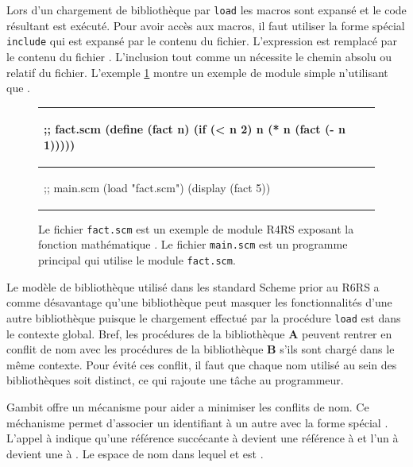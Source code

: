 Lors d'un chargement de bibliothèque par \texttt{load} les macros sont expansé
et le code résultant est exécuté. Pour avoir accès aux macros, il faut utiliser la
forme spécial \texttt{include} qui est expansé par le contenu du fichier.
L'expression  est remplacé par le contenu du fichier
. L'inclusion tout comme un  nécessite le chemin
absolu ou relatif du fichier. L'exemple \ref{fig:r4rs_fact} montre un exemple
de module simple n'utilisant que .

\begin{figure}[ht]
  \begin{center}
    \begin{tabular}{|l|}
    \hline
    \begin{mplisting}{0.4}
;; fact.scm
(define (fact n)
  (if (< n 2)
    n
    (* n (fact (- n 1)))))
\end{mplisting} \\\hline
    \begin{mplisting}{0.4}
;; main.scm
(load "fact.scm")
(display (fact 5))
\end{mplisting} \\\hline
    \end{tabular}
  \end{center}
  \caption{Le fichier \texttt{fact.scm} est un exemple de module R4RS exposant
  la fonction mathématique . Le fichier \texttt{main.scm} est un
  programme principal qui utilise le module \texttt{fact.scm}.}
  \label{fig:r4rs_fact}
\end{figure}

Le modèle de bibliothèque utilisé dans les standard Scheme prior au
R6RS\cite{Scheme:R6RS} a comme désavantage qu'une bibliothèque peut masquer les
fonctionnalités d'une autre bibliothèque puisque le chargement effectué par la
procédure \texttt{load} est dans le contexte global. Bref, les procédures de la
bibliothèque \textbf{A} peuvent rentrer en conflit de nom avec les procédures
de la bibliothèque \textbf{B} s'ils sont chargé dans le même contexte.  Pour
évité ces conflit, il faut que chaque nom utilisé au sein des bibliothèques
soit distinct, ce qui rajoute une tâche au programmeur.


Gambit offre un mécanisme pour aider a minimiser les conflits de nom. Ce
méchanisme permet d'associer un identifiant à un autre avec la forme spécial
.  L'appel à  indique
qu'une référence succécante à  devient une référence à
 et l'un à  devient une à . Le espace
de nom dans lequel  et  est .


